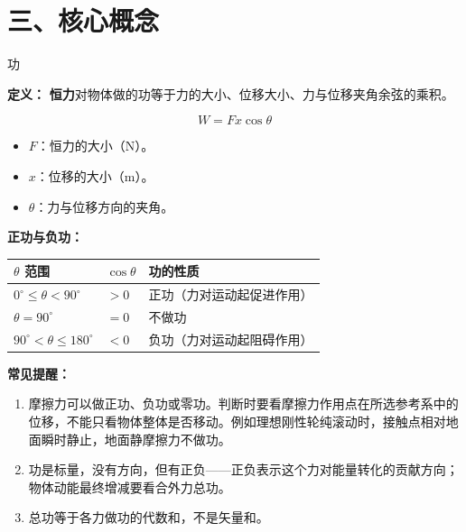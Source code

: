 \section*{三、核心概念}

\begin{conceptbox}{功}

\textbf{定义：} \textbf{恒力}对物体做的功等于力的大小、位移大小、力与位移夹角余弦的乘积。

\[
\boxed{W = F x \cos\theta}
\]

\begin{itemize}
  \item $F$：恒力的大小（$\mathrm{N}$）。
  \item $x$：位移的大小（$\mathrm{m}$）。
  \item $\theta$：力与位移方向的夹角。
\end{itemize}

\textbf{正功与负功：}
\begin{center}
\begin{tabular}{lll}
\toprule
$\theta$ 范围 & $\cos\theta$ & 功的性质 \\
\midrule
$0^\circ \leq \theta < 90^\circ$ & $>0$ & 正功（力对运动起促进作用） \\
$\theta = 90^\circ$ & $=0$ & 不做功 \\
$90^\circ < \theta \leq 180^\circ$ & $<0$ & 负功（力对运动起阻碍作用） \\
\bottomrule
\end{tabular}
\end{center}

\begin{center}


\label{fig:work-done}
\end{center}

\textbf{常见提醒：}
\begin{enumerate}
  \item 摩擦力可以做正功、负功或零功。判断时要看摩擦力作用点在所选参考系中的位移，不能只看物体整体是否移动。例如理想刚性轮纯滚动时，接触点相对地面瞬时静止，地面静摩擦力不做功。
  \item 功是标量，没有方向，但有正负——正负表示这个力对能量转化的贡献方向；物体动能最终增减要看合外力总功。
  \item 总功等于各力做功的代数和，不是矢量和。
\end{enumerate}

\end{conceptbox}

